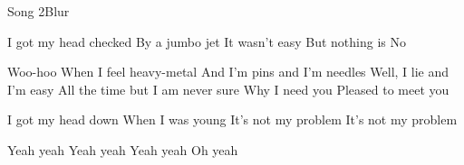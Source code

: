 \begin{Song}{Song 2}{Blur}

\begin{Verse}
I got my head checked
By a jumbo jet
It wasn't easy
But nothing is
No
\end{Verse}
\espaceInterStrophe

\begin{Chorus}
Woo-hoo
When I feel heavy-metal
And I'm pins and I'm needles
Well, I lie and I'm easy
All the time but I am never sure
Why I need you
Pleased to meet you
\end{Chorus}
\espaceInterStrophe

\begin{Verse}
I got my head down
When I was young
It's not my problem
It's not my problem
\end{Verse}
\espaceInterStrophe

\tochorus
\espaceInterStrophe

\begin{Chorus}
Yeah yeah
Yeah yeah
Yeah yeah
Oh yeah
\end{Chorus}

\vfill

\begin{multicols}{2}

\gridGroupNormal

\begin{Chords}
\hline
\\\hline
\end{Chords}
\espaceInterGrille


\begin{Chords}
\hline
\\\hline
\end{Chords}

\end{multicols}

\vfill

\end{Song}



